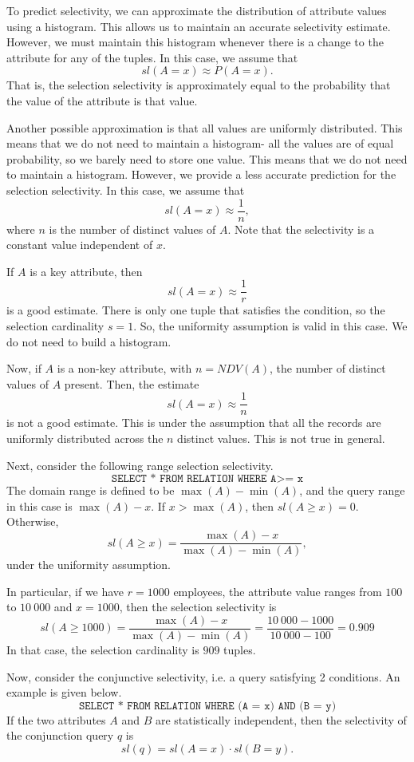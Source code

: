 \documentclass[a4paper, openany]{memoir}
\theoremstyle{definition}
\theoremstyle{plain}
\begin{document}
To predict selectivity, we can approximate the distribution of attribute values using a histogram. This allows us to maintain an accurate selectivity estimate. However, we must maintain this histogram whenever there is a change to the attribute for any of the tuples. In this case, we assume that
\[\textit{sl}(A = x) \approx P(A = x).\]
That is, the selection selectivity is approximately equal to the probability that the value of the attribute is that value.

Another possible approximation is that all values are uniformly distributed. This means that we do not need to maintain a histogram- all the values are of equal probability, so we barely need to store one value.
This means that we do not need to maintain a histogram. However, we provide a less accurate prediction for the selection selectivity. In this case, we assume that
\[\textit{sl}(A = x) \approx \frac{1}{n},\]
where $n$ is the number of distinct values of $A$. Note that the selectivity is a constant value independent of $x$. 

If $A$ is a key attribute, then
\[\textit{sl}(A = x) \approx \frac{1}{r}\]
is a good estimate. There is only one tuple that satisfies the condition, so the selection cardinality $s = 1$. So, the uniformity assumption is valid in this case. We do not need to build a histogram.

Now, if $A$ is a non-key attribute, with $n = NDV(A)$, the number of distinct values of $A$ present. Then, the estimate
\[\textit{sl}(A = x) \approx \frac{1}{n}\]
is not a good estimate. This is under the assumption that all the records are uniformly distributed across the $n$ distinct values. This is not true in general.

Next, consider the following range selection selectivity.
\[\texttt{SELECT * FROM RELATION WHERE A>= x}\]
The domain range is defined to be $\max (A) - \min (A)$, and the query range in this case is $\max(A) - x$. If $x > \max(A)$, then $\textit{sl}(A \geq x) = 0$. Otherwise,
\[\textit{sl}(A \geq x) = \frac{\max(A) - x}{\max(A) - \min(A)},\]
under the uniformity assumption.

In particular, if we have $r = 1000$ employees, the attribute value ranges from $100$ to $10 \ 000$ and $x = 1000$, then the selection selectivity is
\[\textit{sl}(A \geq 1000) = \frac{\max(A) - x}{\max(A) - \min(A)} = \frac{10 \ 000 - 1000}{10 \ 000 - 100} = 0.909\]
In that case, the selection cardinality is $909$ tuples.

Now, consider the conjunctive selectivity, i.e. a query satisfying 2 conditions. An example is given below.
\[\texttt{SELECT * FROM RELATION WHERE (A = x) AND (B = y)}\]
If the two attributes $A$ and $B$ are statistically independent, then the selectivity of the conjunction query $q$ is
\[\textit{sl}(q) = \textit{sl}(A = x) \cdot \textit{sl}(B = y).\]
\end{document}
